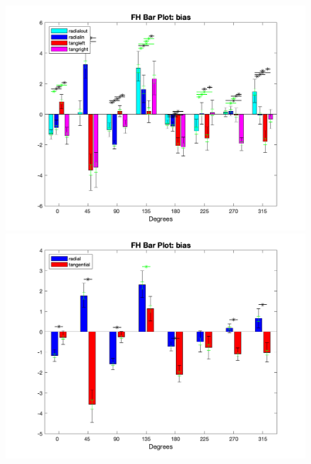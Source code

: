 \documentclass[11pt]{article} %
\begin{document}
\begin{figure}[H]
\centering %
\includegraphics[scale=.35]{Images/FH_BP_bias_Alldata_4conds.png}
\includegraphics[scale=.35]{Images/FH_BP_bias_Alldata_2conds.png}
\end{figure}
\end{document}
